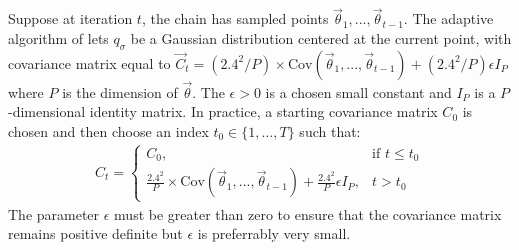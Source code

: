 Suppose at iteration $t$,  the chain has sampled points $\vec{\theta}_1,...,\vec{\theta}_{t-1}$. The adaptive algorithm of \citet{haario01} lets  $q_\sigma$ be a Gaussian distribution centered at the current point, with covariance matrix equal to $\vec{C}_t= (2.4^2/P)\times \text{Cov}(\vec{\theta}_1,...,\vec{\theta}_{t-1}) + (2.4^2/P) \epsilon I_P$ where $P$ is the dimension of $\vec{\theta}$.  The $\epsilon > 0$ is a chosen small constant and $I_P$ is a $P$-dimensional identity matrix. In practice, a starting covariance matrix $C_0$ is chosen and then choose an index $t_0 \in \{1,\dots,T\}$ such that: 
\begin{align*}
    C_t = 
\begin{cases}
    C_0 ,& \text{if } t\leq t_0\\
    \frac{2.4^2}{P}\times\text{Cov}(\vec{\theta}_1,...,\vec{\theta}_{t-1}) + \frac{2.4^2}{P} \epsilon I_P,              & t > t_0
\end{cases}
\end{align*}
The parameter $\epsilon$ must be greater than zero to ensure that the covariance matrix remains positive definite but $\epsilon$ is preferrably very small.




